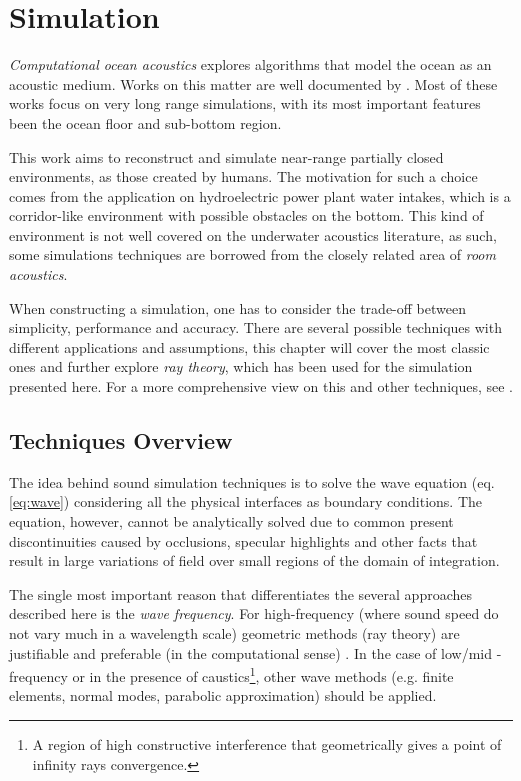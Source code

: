 \section{Simulation}

\textit{Computational ocean
acoustics} explores algorithms that model
the ocean as an acoustic medium. Works on this matter are well documented by
\citet{Etter2013}. Most of these works focus on very long range simulations,
with its most important features been the ocean floor and sub-bottom region.

This work aims to reconstruct and simulate near-range partially closed
environments, as those created by humans. The motivation for such a choice comes
from the application on hydroelectric power plant water intakes, which is a
corridor-like environment with possible obstacles on the bottom. This kind of environment is not well
covered on the underwater acoustics literature, as such, some simulations
techniques are borrowed from the closely related area of \textit{room
acoustics}.

When constructing a simulation, one has to consider the trade-off between
simplicity, performance and accuracy. There are several possible techniques with
different applications and assumptions, this chapter will cover the most
classic ones and further explore \textit{ray theory}, which has been used for
the simulation presented here. For a more comprehensive view on this and other
techniques, see \citet{LURTON,jensen2011computational}.

\subsection{Techniques Overview}
\label{ss:simuloverview}

The idea behind sound simulation techniques is to solve the wave
equation (eq. \ref{eq:wave}) considering all the physical interfaces as boundary
conditions. The equation, however, cannot be analytically solved due to common
present discontinuities caused by occlusions, specular highlights and other
facts that result in large variations of field over small regions of the
domain of integration\cite{funkhouser2003survey}.

The single most important reason that differentiates the several approaches
described here is the \textit{wave frequency}. For high-frequency (where sound
speed do not vary much in a wavelength scale) geometric methods (ray theory) are
justifiable and preferable (in the computational sense) \cite{urick1979}. In the
case of low/mid - frequency or in the presence of caustics\footnote{A region of
high constructive interference that geometrically gives a point of infinity
rays convergence.}, other wave methods (e.g. finite elements, normal modes,
parabolic approximation) should be applied.

